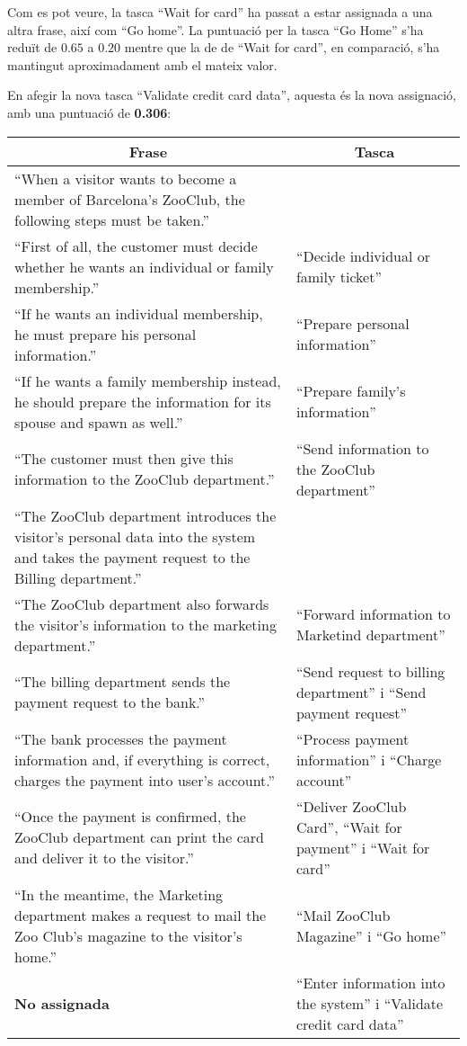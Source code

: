 Com es pot veure, la tasca ``Wait for card'' ha passat a estar assignada a una altra frase, així com ``Go home''. La puntuació per la tasca ``Go Home'' s'ha reduït de $0.65$ a $0.20$ mentre que la de de ``Wait for card'', en comparació, s'ha mantingut aproximadament amb el mateix valor.

En afegir la nova tasca ``Validate credit card data'', aquesta és la nova assignació, amb una puntuació de \textbf{0.306}:

\begin{center}
\begin{tabular}{|p{}|p{}|}
    \hline
    \multicolumn{1}{|c}{\textbf{Frase}} & \multicolumn{1}{|c|}{\textbf{Tasca}} \\ \hline\hline
    ``When a visitor wants to become a member of Barcelona's ZooClub, the following steps must be taken.'' & \\\hline
    ``First of all, the customer must decide whether he wants an individual or family membership.'' & ``Decide individual or family ticket''\\\hline
    ``If he wants an individual membership, he must prepare his personal information.'' & ``Prepare personal information'' \\\hline
    ``If he wants a family membership instead, he should prepare the information for its spouse and spawn as well.'' & ``Prepare family's information'' \\\hline
    ``The customer must then give this information to the ZooClub department.'' & ``Send information to the ZooClub department'' \\\hline
    ``The ZooClub department introduces the visitor's personal data into the system and takes the payment request to the Billing department.'' & \\\hline
    ``The ZooClub department also forwards the visitor's information to the marketing department.'' & ``Forward information to Marketind department'' \\\hline
    ``The billing department sends the payment request to the bank.'' &``Send request to billing department'' i ``Send payment request'' \\\hline
    ``The bank processes the payment information and, if everything is correct, charges the payment into user's account.'' & ``Process payment information'' i  ``Charge account'' \\\hline
    ``Once the payment is confirmed, the ZooClub department can print the card and deliver it to the visitor.'' & ``Deliver ZooClub Card'', ``Wait for payment'' i ``Wait for card''\\\hline
    ``In the meantime, the Marketing department makes a request to mail the Zoo Club's magazine to the visitor's home.'' & ``Mail ZooClub Magazine'' i ``Go home'' \\\hline
    \textbf{No assignada} & ``Enter information into the system'' i ``Validate credit card data'' \\\hline
\end{tabular}
\end{center}

